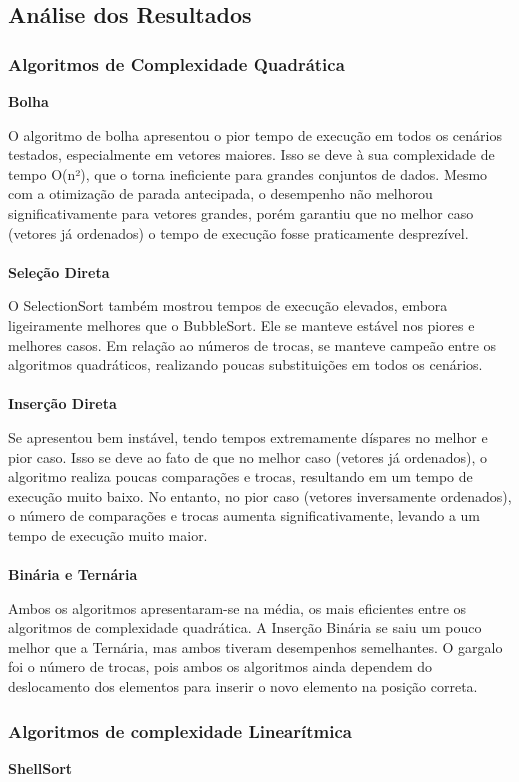 \documentclass[a4paper, 12pt]{article} %
\begin{document}
\subsection{Análise dos Resultados}

\subsubsection{Algoritmos de Complexidade Quadrática}
\textbf{Bolha}

O algoritmo de bolha apresentou o pior tempo de execução em todos os cenários testados, especialmente em vetores maiores.
Isso se deve à sua complexidade de tempo O(n²), que o torna ineficiente para grandes conjuntos de dados.
Mesmo com a otimização de parada antecipada, o desempenho não melhorou significativamente para vetores grandes, porém garantiu que no melhor caso (vetores já ordenados) o tempo de execução fosse praticamente desprezível.
\\ \\
\textbf{Seleção Direta}

O SelectionSort também mostrou tempos de execução elevados, embora ligeiramente melhores que o BubbleSort.
Ele se manteve estável nos piores e melhores casos. Em relação ao números de trocas, se manteve campeão entre os algoritmos quadráticos, realizando poucas substituições em todos os cenários.
\\ \\
\textbf{Inserção Direta}

Se apresentou bem instável, tendo tempos extremamente díspares no melhor e pior caso.
Isso se deve ao fato de que no melhor caso (vetores já ordenados), o algoritmo realiza poucas comparações e trocas, resultando em um tempo de execução muito baixo.
No entanto, no pior caso (vetores inversamente ordenados), o número de comparações e trocas aumenta significativamente, levando a um tempo de execução muito maior.
\\ \\
\textbf{Binária e Ternária}

Ambos os algoritmos apresentaram-se na média, os mais eficientes entre os algoritmos de complexidade quadrática.
A Inserção Binária se saiu um pouco melhor que a Ternária, mas ambos tiveram desempenhos semelhantes.
O gargalo foi o número de trocas, pois ambos os algoritmos ainda dependem do deslocamento dos elementos para inserir o 
novo elemento na posição correta.

\subsubsection{Algoritmos de complexidade Linearítmica}
\textbf{ShellSort}
\end{document}
